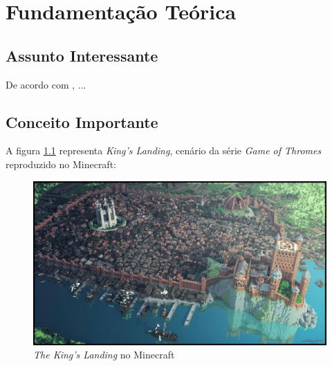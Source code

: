 \chapter{Fundamentação Teórica}

\lipsum[1-2]

\begin{citacao}
\lipsum[1] \cite[p. ~34]{Huizinga2014}
\end{citacao}

\section{Assunto Interessante}

De acordo com , ...

\lipsum[4-7]

\section{Conceito Importante}

\lipsum[8-9]

A figura \ref{fig:kings-landing} representa \emph{King's Landing}, cenário da série \emph{Game of Thromes} reproduzido no Minecraft:

\begin{figure}[h]
	\caption{\emph{The King's Landing} no Minecraft}
	\center
	\label{fig:kings-landing}
	\includegraphics[scale=0.15]{fundamentacao/kings-landing.jpg}
\end{figure}

\lipsum[10-12]

